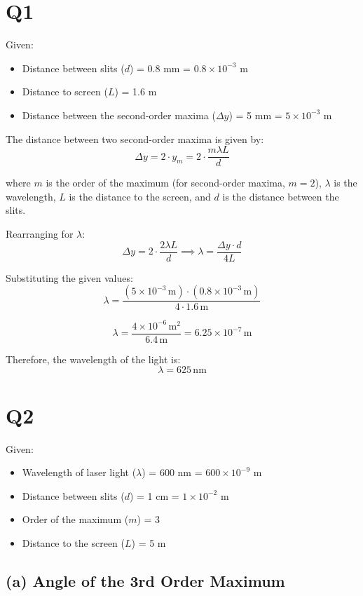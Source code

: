 \documentclass{article}
\begin{document}
\section*{Q1}

Given:
\begin{itemize}
    \item Distance between slits ($d$) = 0.8 mm = \(0.8 \times 10^{-3}\) m
    \item Distance to screen ($L$) = 1.6 m
    \item Distance between the second-order maxima ($\Delta y$) = 5 mm = \(5 \times 10^{-3}\) m
\end{itemize}

The distance between two second-order maxima is given by:
\[
\Delta y = 2 \cdot y_m = 2 \cdot \frac{m \lambda L}{d}
\]

where \(m\) is the order of the maximum (for second-order maxima, \(m = 2\)), \(\lambda\) is the wavelength, \(L\) is the distance to the screen, and \(d\) is the distance between the slits.

Rearranging for \(\lambda\):
\[
\Delta y = 2 \cdot \frac{2 \lambda L}{d} \implies \lambda = \frac{\Delta y \cdot d}{4L}
\]

Substituting the given values:
\[
\lambda = \frac{(5 \times 10^{-3} \, \text{m}) \cdot (0.8 \times 10^{-3} \, \text{m})}{4 \cdot 1.6 \, \text{m}}
\]

\[
\lambda = \frac{4 \times 10^{-6} \, \text{m}^2}{6.4 \, \text{m}} = 6.25 \times 10^{-7} \, \text{m}
\]

Therefore, the wavelength of the light is:
\[
\lambda = 625 \, \text{nm}
\]

\section*{Q2}

Given:
\begin{itemize}
    \item Wavelength of laser light ($\lambda$) = 600 nm = \(600 \times 10^{-9}\) m
    \item Distance between slits ($d$) = 1 cm = \(1 \times 10^{-2}\) m
    \item Order of the maximum ($m$) = 3
    \item Distance to the screen ($L$) = 5 m
\end{itemize}

\subsection*{(a) Angle of the 3rd Order Maximum}
\end{document}
